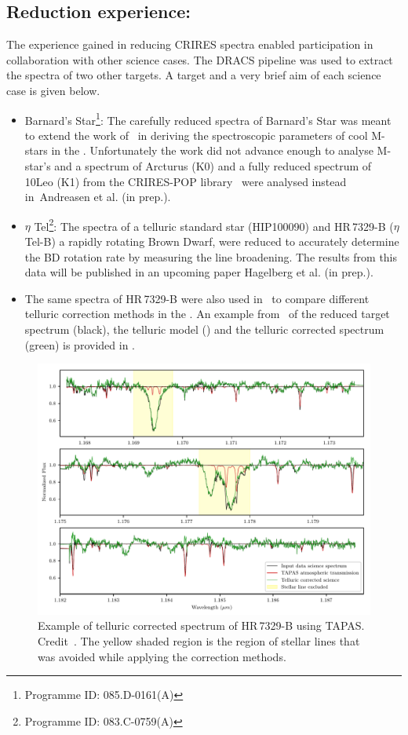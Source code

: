 \subsection{Reduction experience:}
\label{subsec:experience}
The experience gained in reducing {CRIRES} spectra enabled participation in collaboration with other science cases. The {DRACS} pipeline was used to extract the spectra of two other targets. A target and a very brief aim of each science case is given below.
\begin{itemize}
\item Barnard's Star\footnote{Programme {{ID}}: 085.D-0161(A)}: The carefully reduced \nir{} spectra of Barnard's Star was meant to extend the work of~\citet{andreasen_nearinfrared_2016} in deriving the spectroscopic parameters of cool M-stars in the \nir{}. Unfortunately the work did not advance enough to analyse M-star's and a spectrum of {Arcturus} (K0) and a fully reduced spectrum of {10Leo} (K1) from the {CRIRES}-POP library~\cite{nicholls_crirespop_2017} were analysed instead in~{Andreasen et al. (in prep.)}.
\item \(\eta\) Tel\footnote{Programme {{ID}}: 083.C-0759(A)}: The spectra of a telluric standard star (HIP100090) and {HR\,7329-B} (\(\eta\) Tel-B) a rapidly rotating Brown Dwarf, were reduced to accurately determine the BD rotation rate by measuring the line broadening. The results from this data will be published in an upcoming paper Hagelberg et al. (in prep.).
\item The same spectra of {HR\,7329-B} were also used in~\citet{ulmer-moll_telluric_2018} to compare different telluric correction methods in the \nir{}. An example from~\citet[][(B.3)]{ulmer-moll_telluric_2018} of the reduced target spectrum (black), the telluric model () and the telluric corrected spectrum (green) is provided in .
\end{itemize}

\begin{figure}
    \centering
    \includegraphics[width=0.7\linewidth]{figures/reduction/ulmermol2018_tell_corr_CRIRES_48}
    \caption{Example of telluric corrected spectrum of {HR\,7329-B} using TAPAS. Credit~\citet[][]{ulmer-moll_telluric_2018}. The yellow shaded region is the region of stellar lines that was avoided while applying the correction methods.}
    \label{fig:ulmermol2018tellcorrcrires48}
\end{figure}

